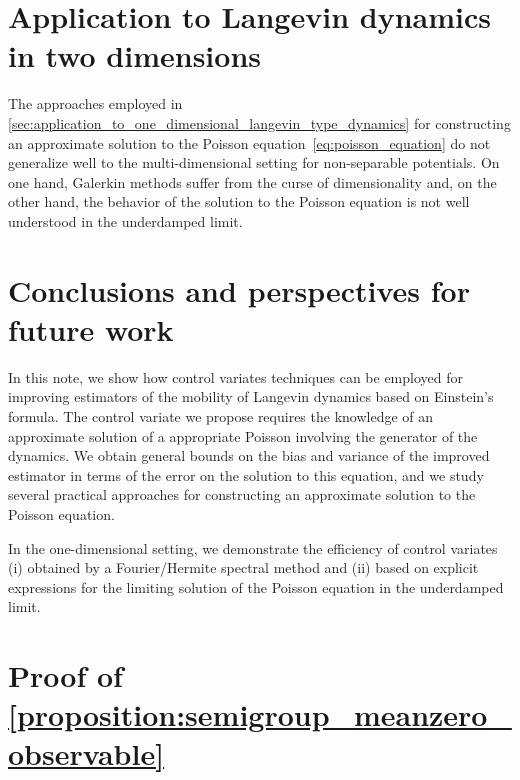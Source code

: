 \documentclass[11pt,a4paper]{article}
\theoremstyle{plain}
\numberwithin{equation}{section}
\begin{document}

\section{Application to Langevin dynamics in two dimensions}%
\label{sec:applications_2d}%
The approaches employed in \cref{sec:application_to_one_dimensional_langevin_type_dynamics} for constructing an approximate solution to the Poisson equation~\eqref{eq:poisson_equation}
do not generalize well to the multi-dimensional setting for non-separable potentials.
On one hand, Galerkin methods suffer from the curse of dimensionality and,
on the other hand, the behavior of the solution to the Poisson equation is not well understood in the underdamped limit.

\section{Conclusions and perspectives for future work}%
\label{sec:conclusions_and_perspectives_for_future_work}
In this note,
we show how control variates techniques can be employed for improving estimators of the mobility of Langevin dynamics based on Einstein's formula.
The control variate we propose requires the knowledge of an approximate solution of a appropriate Poisson involving the generator of the dynamics.
We obtain general bounds on the bias and variance of the improved estimator in terms of the error on the solution to this equation,
and we study several practical approaches for constructing an approximate solution to the Poisson equation.

In the one-dimensional setting,
we demonstrate the efficiency of control variates
(i) obtained by a Fourier/Hermite spectral method and
(ii) based on explicit expressions for the limiting solution of the Poisson equation in the underdamped limit.

\appendix
\section{Proof of \texorpdfstring{\cref{proposition:semigroup_meanzero_observable}}{Proposition 2.1}}%
\label{sec:auxiliary_technical_results}
\end{document}
